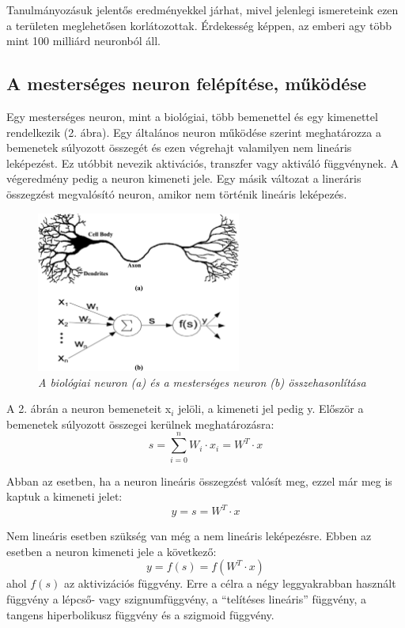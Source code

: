 \documentclass[a4paper]{article}
\begin{document}
Tanulmányozásuk jelentős eredményekkel járhat, mivel jelenlegi ismereteink ezen a területen meglehetősen korlátozottak. Érdekesség képpen, az emberi agy több mint 100 milliárd neuronból áll. 

\subsection{A mesterséges neuron felépítése, működése}
Egy mesterséges neuron, mint a biológiai, több bemenettel és egy kimenettel rendelkezik (2. ábra). Egy általános neuron működése szerint  meghatározza a bemenetek súlyozott összegét és ezen végrehajt valamilyen nem lineáris leképezést. Ez utóbbit nevezik aktivációs, transzfer vagy aktiváló függvénynek. A végeredmény pedig a neuron kimeneti jele. Egy másik változat a lineráris összegzést megvalósító neuron, amikor nem történik lineáris leképezés.

\begin{figure}[hb]
  \centering
  \includegraphics[width=0.6\textwidth]{artifical_neuron}
  \caption{\textit{A biológiai neuron (a) és a mesterséges neuron (b) összehasonlítása}}
\end{figure}

A 2. ábrán a neuron bemeneteit x${_i}$ jelöli, a kimeneti jel pedig y. Először a bemenetek súlyozott összegei kerülnek meghatározásra: $${s=\sum_{i=0}^{n} W_i \cdot x_i = W^T \cdot x}$$

Abban az esetben, ha a neuron lineáris összegzést valósít meg, ezzel már meg is kaptuk a kimeneti jelet:$${y = s = W^T \cdot x}$$

Nem lineáris esetben szükség van még a nem lineáris leképezésre. Ebben az esetben a neuron kimeneti jele a következő:$${y = f(s) = f(W^T \cdot x)}$$ ahol ${f(s)}$ az aktivizációs függvény. Erre a célra a négy leggyakrabban használt függvény a lépcső- vagy szignumfüggvény, a ``telítéses lineáris'' függvény, a tangens hiperbolikusz függvény és a szigmoid függvény.
\end{document}
